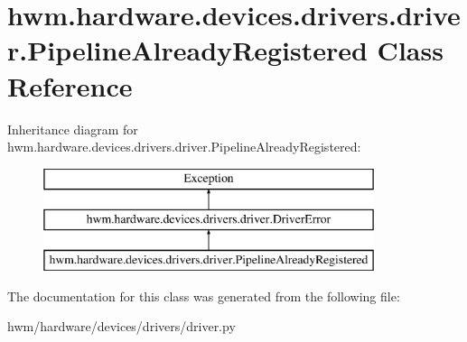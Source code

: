 \hypertarget{classhwm_1_1hardware_1_1devices_1_1drivers_1_1driver_1_1_pipeline_already_registered}{\section{hwm.\-hardware.\-devices.\-drivers.\-driver.\-Pipeline\-Already\-Registered Class Reference}
\label{classhwm_1_1hardware_1_1devices_1_1drivers_1_1driver_1_1_pipeline_already_registered}
}
Inheritance diagram for hwm.\-hardware.\-devices.\-drivers.\-driver.\-Pipeline\-Already\-Registered\-:\begin{figure}[H]
\begin{center}
\leavevmode
\includegraphics[height=3.000000cm]{classhwm_1_1hardware_1_1devices_1_1drivers_1_1driver_1_1_pipeline_already_registered}
\end{center}
\end{figure}


The documentation for this class was generated from the following file\-:\begin{DoxyCompactItemize}
\item 
hwm/hardware/devices/drivers/driver.\-py\end{DoxyCompactItemize}
